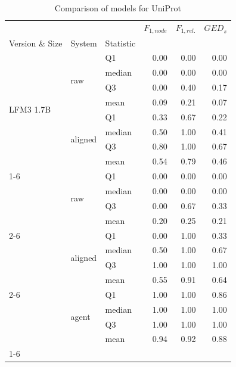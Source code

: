 \begin{table}
\caption{Comparison of models for UniProt}
\label{tab:compare_model_UniProt}
\begin{tabular}{lllrrr}
\toprule
 &  &  & $F_{1,node}$ & $F_{1,rel.}$ & $GED_{s}$ \\
Version \& Size & System & Statistic &  &  &  \\
\midrule
\multirow[t]{8}{*}{LFM3 1.7B} & \multirow[t]{4}{*}{raw} & Q1 & 0.00 & 0.00 & 0.00 \\
 &  & median & 0.00 & 0.00 & 0.00 \\
 &  & Q3 & 0.00 & 0.40 & 0.17 \\
 &  & mean & 0.09 & 0.21 & 0.07 \\
\cline{2-6}
 & \multirow[t]{4}{*}{aligned} & Q1 & 0.33 & 0.67 & 0.22 \\
 &  & median & 0.50 & 1.00 & 0.41 \\
 &  & Q3 & 0.80 & 1.00 & 0.67 \\
 &  & mean & 0.54 & 0.79 & 0.46 \\
\cline{1-6} \cline{2-6}
\multirow[t]{12}{*}{Qwen3.8 27B} & \multirow[t]{4}{*}{raw} & Q1 & 0.00 & 0.00 & 0.00 \\
 &  & median & 0.00 & 0.00 & 0.00 \\
 &  & Q3 & 0.00 & 0.67 & 0.33 \\
 &  & mean & 0.20 & 0.25 & 0.21 \\
\cline{2-6}
 & \multirow[t]{4}{*}{aligned} & Q1 & 0.00 & 1.00 & 0.33 \\
 &  & median & 0.50 & 1.00 & 0.67 \\
 &  & Q3 & 1.00 & 1.00 & 1.00 \\
 &  & mean & 0.55 & 0.91 & 0.64 \\
\cline{2-6}
 & \multirow[t]{4}{*}{agent} & Q1 & 1.00 & 1.00 & 0.86 \\
 &  & median & 1.00 & 1.00 & 1.00 \\
 &  & Q3 & 1.00 & 1.00 & 1.00 \\
 &  & mean & 0.94 & 0.92 & 0.88 \\
\cline{1-6} \cline{2-6}
\bottomrule
\end{tabular}
\end{table}
